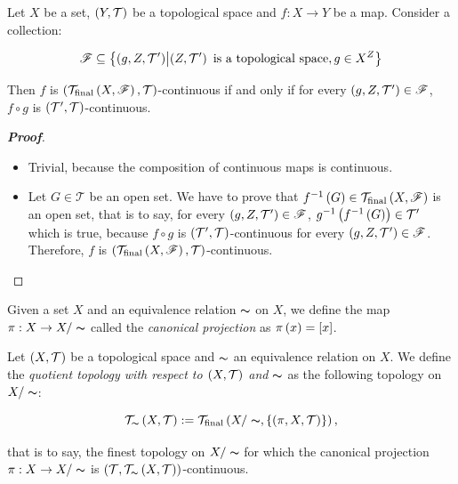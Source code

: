 \begin{proposition}\label{Continuity with respect to the strong topology}
  Let $X$ be a set, $\left(Y,\mathcal{T}\right)$ be a topological space and $f:X\rightarrow Y$ be a map. Consider a collection:
  
  \begin{equation}
    \mathscr{F}\subseteq\left\{\left(g,Z,\mathcal{T}'\right)\middle|\left(Z,\mathcal{T}'\right)\text{ is a topological space}, g\in X^Z\right\}
  \end{equation}

  Then $f$ is $\left(\mathcal{T}_{\text{final}}\left(X,\mathscr{F}\right),\mathcal{T}\right)$-continuous if and only if for every $\left(g,Z,\mathcal{T}'\right)\in\mathscr{F}$, $f\circ g$ is $\left(\mathcal{T}',\mathcal{T}\right)$-continuous.
  \begin{proof}[\rm\textbf{Proof}]
    \hfill
    \begin{itemize}
      \item[\boxed{\Rightarrow}] Trivial, because the composition of continuous maps is continuous.
      \item[\boxed{\Leftarrow}] Let $G\in\mathcal{T}$ be an open set. We have to prove that $f^{-1}\left(G\right)\in\mathcal{T}_{\text{final}}\left(X,\mathscr{F}\right)$ is an open set, that is to say, for every $\left(g,Z,\mathcal{T}'\right)\in\mathscr{F}$, $g^{-1}\left(f^{-1}\left(G\right)\right)\in\mathcal{T}'$ which is true, because $f\circ g$ is $\left(\mathcal{T}',\mathcal{T}\right)$-continuous for every $\left(g,Z,\mathcal{T}'\right)\in\mathscr{F}$. Therefore, $f$ is $\left(\mathcal{T}_{\text{final}}\left(X,\mathscr{F}\right),\mathcal{T}\right)$-continuous. 
    \end{itemize}
  \end{proof}
\end{proposition}

Given a set $X$ and an equivalence relation $\thicksim$ on $X$, we define the map $\pi:X\rightarrow X/\thicksim$ called the \textit{canonical projection} as $\pi\left(x\right)=\left[x\right]$.

\begin{definition}
  \rm Let $\left(X,\mathcal{T}\right)$ be a topological space and $\thicksim$ an equivalence relation on $X$. We define the \textit{quotient topology with respect to $\left(X,\mathcal{T}\right)$ and $\thicksim$} as the following topology on $X/\thicksim$:
  
  \begin{equation}
    \mathcal{T}_{\thicksim}\left(X,\mathcal{T}\right):=\mathcal{T}_{\text{final}}\left(X/\thicksim,\left\{\left(\pi,X,\mathcal{T}\right)\right\}\right),
  \end{equation}

  that is to say, the finest topology on $X/\thicksim$ for which the canonical projection $\pi:X\rightarrow X/\thicksim$ is $\left(\mathcal{T},\mathcal{T}_{\thicksim}\left(X,\mathcal{T}\right)\right)$-continuous.
\end{definition}

